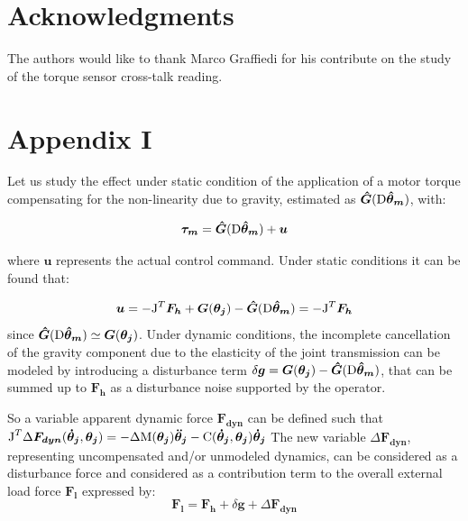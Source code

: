 \documentclass[journal]{IEEEtran}
\newcommand{\vectm}[1]{ { {\text #1} }}
\newcommand{\vects}[1]{{\boldsymbol {#1}}}
\begin{document}
\section*{Acknowledgments}


The authors would like to thank Marco Graffiedi for his contribute on the study of the torque sensor cross-talk reading.


\section{Appendix I}




Let us study the effect under static condition of the application of a motor torque compensating for the non-linearity due to gravity, estimated as 
$\vects{\hat{G}}(\vectm{D} \vects{\hat{\theta}_m})$, with:

\begin{equation}
\vects{\tau_m}=  \vects{\hat{G}}(\vectm{D} \vects{\hat{\theta}_m})+\vects{u}
\label{eq:inputForce}
\end{equation}

where  $\vects{u}$ represents the actual control command.
Under static conditions it can be found that:

\begin{equation}
\vects{u}=-  \vectm{J}^T \vects{F_h} +\vects{G}( \vects{\theta_j}) - \vects{\hat{G}}(\vectm{D} \vects{\hat{\theta}_m})= - \vectm{J}^T \vects{F_h}
\label{eq:inputInStaticCondition}
\end{equation}
since $\vects{\hat{G}}(\vectm{D} \vects{\hat{\theta}_m}) \simeq \vects{G}( \vects{\theta_j})$. Under dynamic conditions, the incomplete cancellation of the gravity component due to the elasticity of the joint transmission can be modeled by introducing a disturbance term $\delta \vects{g}=\vects{G}( \vects{\theta_j}) - \vects{\hat{G}}(\vectm{D} \vects{\hat{\theta}_m})$, that can be summed up 
to $\vects{F_h}$ as a disturbance noise supported by the operator.


So a variable apparent dynamic force $\vects{F_{dyn}}$ can be defined   such that
$\vectm{J}^T \Delta \vects{ F_{dyn}}( \vects{\dot{\theta}_j}, \vects{\theta_j})  =- \Delta \vectm{M} ( \vects{\theta_j}) \vects{\ddot{\theta}_j} - \vectm{C}( \vects{\dot{\theta}_j}, \vects{\theta_j})  \vects{\dot{\theta}_j}  $
The new variable $\Delta \vects{F_{dyn}}$,  representing uncompensated and/or unmodeled dynamics, can be considered as a disturbance force and considered as a contribution term to the overall external load  force  $\vects{F_l}$ expressed by:
\begin{equation}
\vects{F_l}= \vects{F_h} + \delta \vects{g}  + \Delta \vects{F_{dyn}}
\label{eq:extraForces}
\end{equation}
\end{document}
